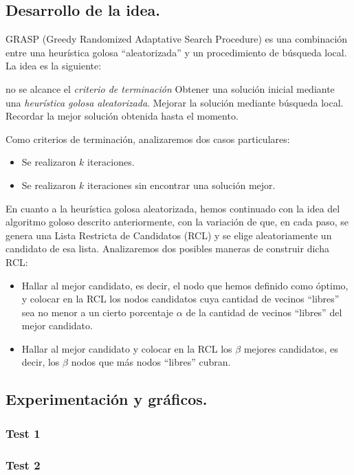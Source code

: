 \subsection{Desarrollo de la idea.}

\vspace*{0.3cm}

GRASP (Greedy Randomized Adaptative Search Procedure) es una combinación entre una heurística golosa ``aleatorizada'' y un procedimiento de búsqueda local.  La idea es la siguiente:

\begin{codebox}
\li \While no se alcance el {\it criterio de terminación}
\li \Do 
		Obtener una solución inicial mediante una {\it heurística golosa aleatorizada}.
\li 		Mejorar la solución mediante búsqueda local.
\li 		Recordar la mejor solución obtenida hasta el momento.
	\End
\end{codebox}

Como criterios de terminación, analizaremos dos casos particulares:

\begin{itemize}
\item Se realizaron $k$ iteraciones.
\item Se realizaron $k$ iteraciones sin encontrar una solución mejor.
\end{itemize}

En cuanto a la heurística golosa aleatorizada, hemos continuado con la idea del algoritmo goloso descrito anteriormente, con la variación de que, en cada paso, se genera una Lista Restricta de Candidatos (RCL) y se elige aleatoriamente un candidato de esa lista.  Analizaremos dos posibles maneras de construir dicha RCL:

\begin{itemize}
\item Hallar al mejor candidato, es decir, el nodo que hemos definido como óptimo, y colocar en la RCL los nodos candidatos cuya cantidad de vecinos ``libres'' sea no menor a un cierto porcentaje $\alpha$ de la cantidad de vecinos ``libres'' del mejor candidato.
\item Hallar al mejor candidato y colocar en la RCL los $\beta$ mejores candidatos, es decir, los $\beta$ nodos que más nodos ``libres'' cubran.
\end{itemize}

\vspace*{0.6cm}

\subsection{Experimentación y gráficos.}

\vspace*{0.3cm}


\subsubsection{Test 1}
\vspace*{0.3cm}

\vspace*{0.6cm}

\subsubsection{Test 2}

